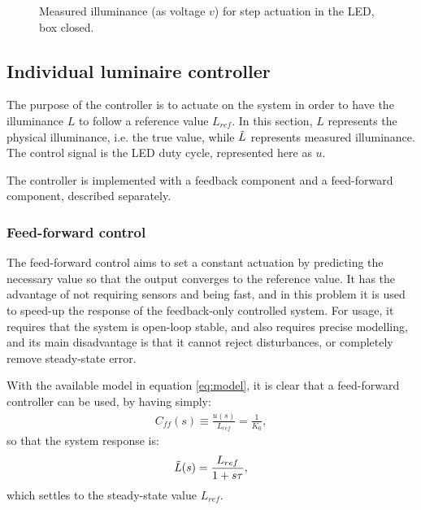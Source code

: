 \documentclass[english,fira]{ist-report}
\begin{document}
\begin{figure}[ht]
    \centering
    \caption{Measured illuminance (as voltage $v$) for step actuation in the LED, box closed.}
    \label{fig:steps}
\end{figure}


\subsection{Individual luminaire controller}\label{sec:ind-controller}

The purpose of the controller is to actuate on the system in order to have the illuminance $L$ to follow a reference value $L_{ref}$. In this section, $L$ represents the physical illuminance, i.e. the true value, while $\Tilde{L}$ represents measured illuminance. The control signal is the LED duty cycle, represented here as $u$.

The controller is implemented with a feedback component and a feed-forward component, described separately.

\subsubsection{Feed-forward control}

The feed-forward control aims to set a constant actuation by predicting the necessary value so that the output converges to the reference value. 
It has the advantage of not requiring sensors and being fast, and in this problem it is used to speed-up the response of the feedback-only controlled system. 
For usage, it requires that the system is open-loop stable, and also requires precise modelling, and its 
main disadvantage is that it cannot reject disturbances, or completely remove steady-state error.

With the available model in equation \ref{eq:model}, it is clear that a feed-forward controller can be used, by having simply:
\begin{align}
    C_{ff}(s) \equiv \frac{u(s)}{L_{ref}} = \frac{1}{K_0},
    \label{eq:ff}
\end{align}
so that the system response is:
\begin{align}
    \Tilde{L}(s) = \frac{L_{ref}}{1+s\tau}, 
    \label{eq:response-ff}
\end{align}
which settles to the steady-state value $L_{ref}$.
\end{document}
